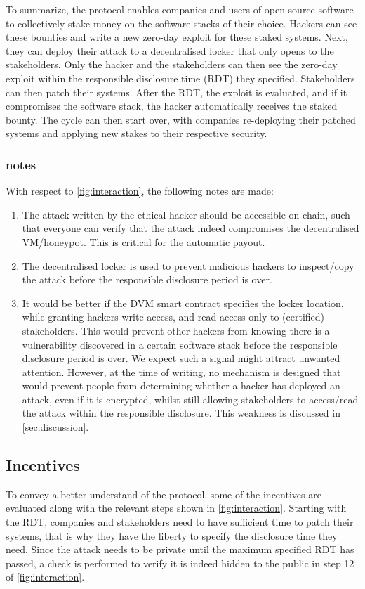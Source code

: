 \noindent To summarize, the protocol enables companies and users of open source software to collectively stake money on the software stacks of their choice. Hackers can see these bounties and write a new zero-day exploit for these staked systems. Next, they can deploy their attack to a decentralised locker that only opens to the stakeholders. Only the hacker and the stakeholders can then see the zero-day exploit within the responsible disclosure time (RDT) they specified. Stakeholders can then patch their systems. After the RDT, the exploit is evaluated, and if it compromises the software stack, the hacker automatically receives the staked bounty. The cycle can then start over, with companies re-deploying their patched systems and applying new stakes to their respective security.


\subsubsection{ notes}
With respect to \cref{fig:interaction}, the following notes are made:
\begin{enumerate} 
    \item The attack written by the ethical hacker should be accessible on chain, such that everyone can verify that the attack indeed compromises the decentralised VM/honeypot. This is critical for the automatic payout.
    \item The decentralised locker is used to prevent malicious hackers to inspect/copy the attack before the responsible disclosure period is over.
    \item It would be better if the DVM smart contract specifies the locker location, while granting hackers write-access, and read-access only to (certified) stakeholders. This would prevent other hackers from knowing there is a vulnerability discovered in a certain software stack before the responsible disclosure period is over. We expect such a signal might attract unwanted attention. However, at the time of writing, no mechanism is designed that would prevent people from determining whether a hacker has deployed an attack, even if it is encrypted, whilst still allowing stakeholders to access/read the attack within the responsible disclosure. This weakness is discussed in \cref{sec:discussion}.
\end{enumerate}

\subsection{Incentives}
To convey a better understand of the protocol, some of the incentives are evaluated along with the relevant steps shown in \cref{fig:interaction}. Starting with the RDT, companies and stakeholders need to have sufficient time to patch their systems, that is why they have the liberty to specify the disclosure time they need. Since the attack needs to be private until the maximum specified RDT has passed, a check is performed to verify it is indeed hidden to the public in step 12 of \cref{fig:interaction}. 

